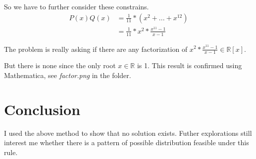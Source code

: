 \documentclass[UTF8, 12pt]{ctexart}
\begin{document}
    So we have to further consider these constrains.
    \begin{align*}
        P(x)Q(x) &= \frac{1}{11} * (x^2 + ... + x^{12}) \\
        &= \frac{1}{11} * x^2 * \frac{x^{11}-1}{x-1}
    \end{align*}
    
    The problem is really asking if there are any factorization of $x^2 * \frac{x^{11}-1}{x-1} \in \mathbb{R}[x]$.

    But there is none since the only root $x \in \mathbb{R}$ is 1. This result is confirmed using Mathematica, see \textit{factor.png} in the folder.
    \section{Conclusion}
        I used the above method to show that no solution exists. Futher explorations still interest me whether there is a
        pattern of possible distribution feasible under this rule.
\end{document}
